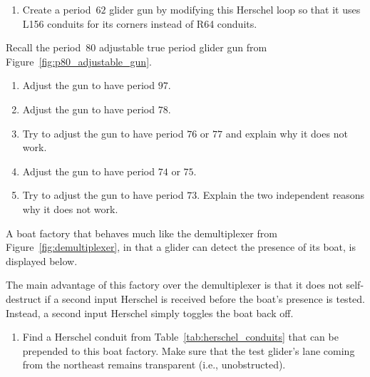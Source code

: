 \begin{multicols}{2}
\begin{problem}
\begin{enumerate}[label=\bf\color{ocre}(\alph*)]
			\item {} Create a period~$62$ glider gun by modifying this Herschel loop so that it uses L156 conduits for its corners instead of R64 conduits.
		\end{enumerate}
	\end{problem}
	
	
	\mfilbreak
	
	
	\begin{problemstar}\label{exer:p80_adjustable_manipulate} 
		Recall the period~$80$ adjustable true period glider gun from Figure~\ref{fig:p80_adjustable_gun}.\smallskip
		
		\begin{enumerate}[label=\bf\color{ocre}(\alph*)]
			\item Adjust the gun to have period $97$.
			
			\item Adjust the gun to have period $78$.
			
			\item Try to adjust the gun to have period $76$ or $77$ and explain why it does not work.
			
			\item Adjust the gun to have period $74$ or $75$.
			
			\item Try to adjust the gun to have period $73$. Explain the two independent reasons why it does not work.
		\end{enumerate}
	\end{problemstar}


	\mfilbreak
	
	
	\begin{problem}\label{exer:toggle_better_demultiplexer}
		A boat factory that behaves much like the demultiplexer from Figure~\ref{fig:demultiplexer}, in that a glider can detect the presence of its boat, is displayed below.
		
		\begin{center}
		\end{center}
	
		\noindent The main advantage of this factory over the demultiplexer is that it does not self-destruct if a second input Herschel is received before the boat's presence is tested. Instead, a second input Herschel simply toggles the boat back off.\smallskip
	
		\begin{enumerate}[label=\bf\color{ocre}(\alph*)]
			\item {} Find a Herschel conduit from Table~\ref{tab:herschel_conduits} that can be prepended to this boat factory. Make sure that the test glider's lane coming from the northeast remains transparent (i.e., unobstructed).
			

\end{enumerate}
\end{problem}
\end{multicols}
